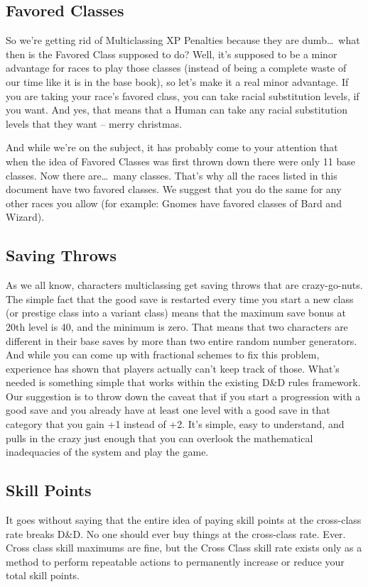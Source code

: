\subsection{Favored Classes}
So we're getting rid of Multiclassing XP Penalties because they are dumb\ldots\  what then is the Favored Class supposed to do? Well, it's supposed to be a minor advantage for races to play those classes (instead of being a complete waste of our time like it is in the base book), so let's make it a real minor advantage. If you are taking your race's favored class, you can take racial substitution levels, if you want. And yes, that means that a Human can take any racial substitution levels that they want -- merry christmas.

And while we're on the subject, it has probably come to your attention that when the idea of Favored Classes was first thrown down there were only 11 base classes. Now there are\ldots\  many classes. That's why all the races listed in this document have two favored classes. We suggest that you do the same for any other races you allow (for example: Gnomes have favored classes of Bard and Wizard).

\subsection{Saving Throws}
As we all know, characters multiclassing get saving throws that are crazy-go-nuts. The simple fact that the good save is restarted every time you start a new class (or prestige class into a variant class) means that the maximum save bonus at 20th level is 40, and the minimum is zero. That means that two characters are different in their base saves by more than two entire random number generators. And while you can come up with fractional schemes to fix this problem, experience has shown that players actually can't keep track of those. What's needed is something simple that works within the existing D\&D rules framework. Our suggestion is to throw down the caveat that if you start a progression with a good save and you already have at least one level with a good save in that category that you gain +1 instead of +2. It's simple, easy to understand, and pulls in the crazy just enough that you can overlook the mathematical inadequacies of the system and play the game.

\subsection{Skill Points}

It goes without saying that the entire idea of paying skill points at the cross-class rate breaks D\&D. No one should ever buy things at the cross-class rate. Ever. Cross class skill maximums are fine, but the Cross Class skill rate exists only as a method to perform repeatable actions to permanently increase or reduce your total skill points.
